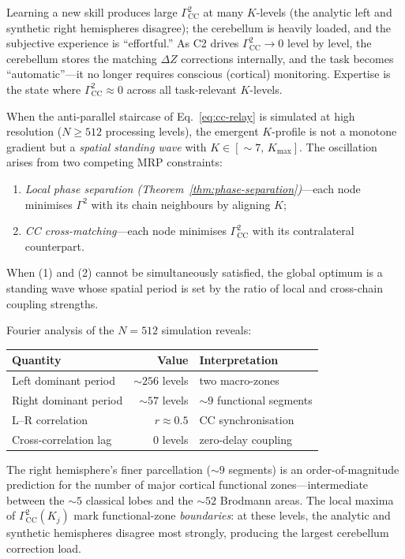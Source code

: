 \documentclass[aps,pre,twocolumn,superscriptaddress,floatfix]{revtex4-2}
\begin{document}
\begin{remark}
\label{rem:skill-acquisition}
Learning a new skill produces large
$\Gamma^2_{\text{CC}}$ at many $K$-levels
(the analytic left and synthetic right hemispheres
disagree); the cerebellum is heavily loaded, and
the subjective experience is ``effortful.''
As C2 drives $\Gamma^2_{\text{CC}} \to 0$
level by level, the cerebellum stores the matching
$\Delta Z$ corrections internally, and the task
becomes ``automatic''---it no longer requires
conscious (cortical) monitoring.
Expertise is the state where
$\Gamma^2_{\text{CC}} \approx 0$ across all
task-relevant $K$-levels.
\end{remark}

\begin{remark}
\label{rem:standing-wave}
When the anti-parallel staircase of
Eq.~\eqref{eq:cc-relay} is simulated at high
resolution ($N \geq 512$ processing levels),
the emergent $K$-profile is not a monotone
gradient but a \emph{spatial standing wave}
with $K \in [\sim\!7,\, K_{\max}]$.
The oscillation arises from two competing MRP
constraints:
\begin{enumerate}
\item \emph{Local phase separation
  (Theorem~\ref{thm:phase-separation})}---each
  node minimises $\Gamma^2$ with its chain
  neighbours by aligning $K$;
\item \emph{CC cross-matching}---each node
  minimises $\Gamma^2_{\text{CC}}$ with its
  contralateral counterpart.
\end{enumerate}
When (1) and (2) cannot be simultaneously
satisfied, the global optimum is a standing wave
whose spatial period is set by the ratio of local
and cross-chain coupling strengths.

Fourier analysis of the $N=512$ simulation reveals:
\begin{center}
\begin{tabular}{@{}lrl@{}}
\toprule
Quantity & Value & Interpretation \\
\midrule
Left dominant period & $\sim 256$ levels &
  two macro-zones \\
Right dominant period & $\sim 57$ levels &
  $\sim 9$ functional segments \\
L--R correlation & $r \approx 0.5$ &
  CC synchronisation \\
Cross-correlation lag & $0$ levels &
  zero-delay coupling \\
\bottomrule
\end{tabular}
\end{center}
The right hemisphere's finer parcellation
($\sim 9$ segments) is an order-of-magnitude
prediction for the number of major cortical
functional zones---intermediate between the
$\sim 5$ classical lobes and the $\sim 52$
Brodmann areas.
The local maxima of
$\Gamma^2_{\text{CC}}(K_j)$
mark functional-zone \emph{boundaries}:
at these levels, the analytic and synthetic
hemispheres disagree most strongly, producing
the largest cerebellum correction load.
\end{remark}
\end{document}

